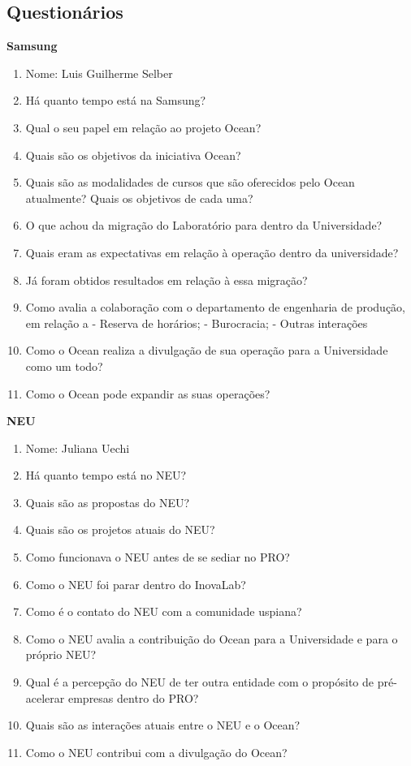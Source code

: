 \begin{anexosenv}

\chapter{Questionários}

\textbf{Samsung}

\begin{enumerate}
\item Nome: Luis Guilherme Selber
\item Há quanto tempo está na Samsung?
\item Qual o seu papel em relação ao projeto Ocean?
\item Quais são os objetivos da iniciativa Ocean?
\item Quais são as modalidades de cursos que são oferecidos pelo Ocean atualmente? Quais os objetivos de cada uma?
\item O que achou da migração do Laboratório para dentro da Universidade?
\item Quais eram as expectativas em relação à operação dentro da universidade?
\item Já foram obtidos resultados em relação à essa migração?
\item Como avalia a colaboração com o departamento de engenharia de produção, em relação a - Reserva de horários; - Burocracia; - Outras interações
\item Como o Ocean realiza a divulgação de sua operação para a Universidade como um todo?
\item Como o Ocean pode expandir as suas operações?
\end{enumerate}

\clearpage

\textbf{NEU}

\begin{enumerate}
\item Nome: Juliana Uechi
\item Há quanto tempo está no NEU?
\item Quais são as propostas do NEU?
\item Quais são os projetos atuais do NEU?
\item Como funcionava o NEU antes de se sediar no PRO?
\item Como o NEU foi parar dentro do InovaLab?
\item Como é o contato do NEU com a comunidade uspiana?
\item Como o NEU avalia a contribuição do Ocean para a Universidade e para o próprio NEU?
\item Qual é a percepção do NEU de ter outra entidade com o propósito de pré-acelerar empresas dentro do PRO?
\item Quais são as interações atuais entre o NEU e o Ocean?
\item Como o NEU contribui com a divulgação do Ocean?
\end{enumerate}


\end{anexosenv}
